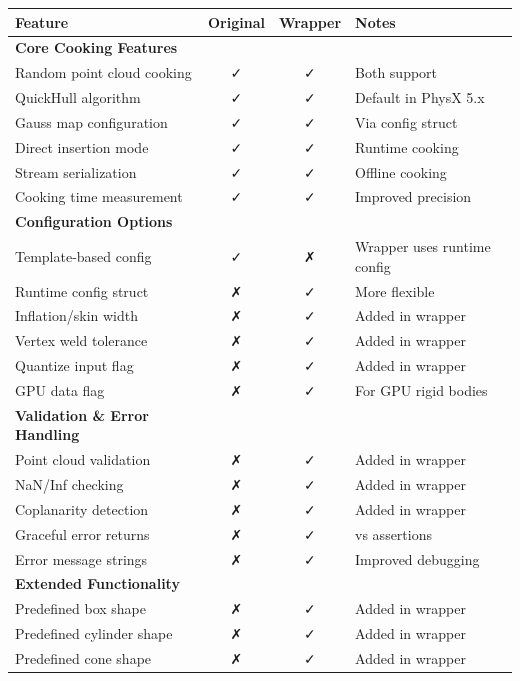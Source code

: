 \begin{table}[h]
\centering
\small
\begin{tabular}{|p{6cm}|c|c|l|}
\hline
\textbf{Feature} & \textbf{Original} & \textbf{Wrapper} & \textbf{Notes} \\
\hline
\textbf{Core Cooking Features} & & & \\
\hline
Random point cloud cooking & ✓ & ✓ & Both support \\
\hline
QuickHull algorithm & ✓ & ✓ & Default in PhysX 5.x \\
\hline
Gauss map configuration & ✓ & ✓ & Via config struct \\
\hline
Direct insertion mode & ✓ & ✓ & Runtime cooking \\
\hline
Stream serialization & ✓ & ✓ & Offline cooking \\
\hline
Cooking time measurement & ✓ & ✓ & Improved precision \\
\hline
\textbf{Configuration Options} & & & \\
\hline
Template-based config & ✓ & ✗ & Wrapper uses runtime config \\
\hline
Runtime config struct & ✗ & ✓ & More flexible \\
\hline
Inflation/skin width & ✗ & ✓ & Added in wrapper \\
\hline
Vertex weld tolerance & ✗ & ✓ & Added in wrapper \\
\hline
Quantize input flag & ✗ & ✓ & Added in wrapper \\
\hline
GPU data flag & ✗ & ✓ & For GPU rigid bodies \\
\hline
\textbf{Validation \& Error Handling} & & & \\
\hline
Point cloud validation & ✗ & ✓ & Added in wrapper \\
\hline
NaN/Inf checking & ✗ & ✓ & Added in wrapper \\
\hline
Coplanarity detection & ✗ & ✓ & Added in wrapper \\
\hline
Graceful error returns & ✗ & ✓ & vs assertions \\
\hline
Error message strings & ✗ & ✓ & Improved debugging \\
\hline
\textbf{Extended Functionality} & & & \\
\hline
Predefined box shape & ✗ & ✓ & Added in wrapper \\
\hline
Predefined cylinder shape & ✗ & ✓ & Added in wrapper \\
\hline
Predefined cone shape & ✗ & ✓ & Added in wrapper \\

\end{tabular}
\end{table}
